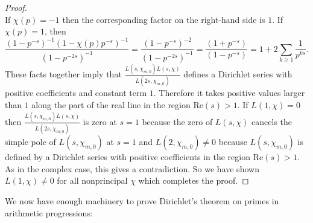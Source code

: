 \documentclass[12pt]{book}
\theoremstyle{definition}\newframedtheorem{method}{Method}
\newcommand{\<}{\langle}
\renewcommand{\>}{\rangle}
\renewcommand{\Re}{\mathrm{Re}}
\begin{document}
\begin{proof}
\[        \]
        If $\chi(p) = -1$ then the corresponding factor on the right-hand side is $1$. If $\chi(p) = 1$, then
        \[
          \frac{(1-p^{-s})^{-1}(1-\chi(p)p^{-s})^{-1}}{(1-p^{-2s})^{-1}} = \frac{(1-p^{-s})^{-2}}{(1-p^{-2s})^{-1}} = \frac{(1+p^{-s})}{(1-p^{-s})} = 1+2\sum_{k \ge 1}\frac{1}{p^{ks}}.
        \]
        These facts together imply that $\frac{L(s,\chi_{m,0})L(s,\chi)}{L(2s,\chi_{m,0})}$ defines a Dirichlet series with positive coefficients and constant term $1$. Therefore it takes positive values larger than $1$ along the part of the real line in the region $\Re(s) > 1$. If $L(1,\chi) = 0$ then $\frac{L(s,\chi_{m,0})L(s,\chi)}{L(2s,\chi_{m,0})}$ is zero at $s = 1$ because the zero of $L(s,\chi)$ cancels the simple pole of $L(s,\chi_{m,0})$ at $s = 1$ and $L(2,\chi_{m,0}) \neq 0$ because $L(s,\chi_{m,0})$ is defined by a Dirichlet series with positive coefficients in the region $\Re(s) > 1$. As in the complex case, this gives a contradiction. So we have shown $L(1,\chi) \neq 0$ for all nonprincipal $\chi$ which completes the proof.
      \end{proof}

      We now have enough machinery to prove Dirichlet's theorem on primes in arithmetic progressions:
\end{document}
